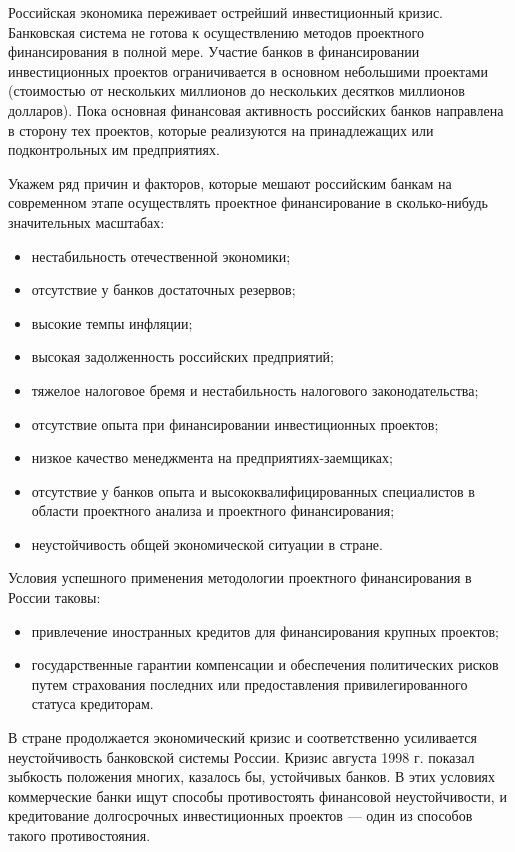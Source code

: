 Российская экономика переживает острейший инвестиционный кризис.
Банковская система не готова к осуществлению методов проектного финансирования в полной мере.
Участие банков в финансировании инвестиционных проектов ограничивается в основном небольшими проектами (стоимостью от нескольких миллионов до нескольких десятков миллионов долларов).
Пока основная финансовая активность российских банков направлена в сторону тех проектов, которые реализуются на принадлежащих или подконтрольных им предприятиях.

Укажем ряд причин и факторов, которые мешают российским банкам на современном этапе осуществлять проектное финансирование в сколько-нибудь значительных масштабах:
\begin{itemize}
	\item нестабильность отечественной экономики;
	\item отсутствие у банков достаточных резервов;
	\item высокие темпы инфляции;
	\item высокая задолженность российских предприятий;
	\item тяжелое налоговое бремя и нестабильность налогового законодательства;
	\item отсутствие опыта при финансировании инвестиционных проектов;
	\item низкое качество менеджмента на предприятиях-заемщиках;
	\item отсутствие у банков опыта и высококвалифицированных специалистов в области проектного анализа и проектного финансирования;
	\item неустойчивость общей экономической ситуации в стране.
\end{itemize}

Условия успешного применения методологии проектного финансирования в России таковы:
\begin{itemize}
	\item привлечение иностранных кредитов для финансирования крупных проектов;
	\item государственные гарантии компенсации и обеспечения политических рисков путем страхования последних или предоставления привилегированного статуса кредиторам.
\end{itemize}

В стране продолжается экономический кризис и соответственно усиливается неустойчивость банковской системы России.
Кризис августа 1998 г. показал зыбкость положения многих, казалось бы, устойчивых банков.
В этих условиях коммерческие банки ищут способы противостоять финансовой неустойчивости, и кредитование долгосрочных инвестиционных проектов --- один из способов такого противостояния.


